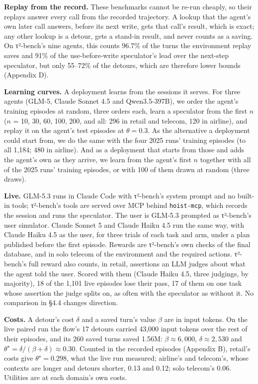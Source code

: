 \documentclass[10pt,twocolumn,letterpaper]{article}
\newcommand{\runin}[1]{{\sffamily\bfseries\color{accent}#1}}
\begin{document}
\runin{Replay from the record.} These benchmarks cannot be re-run cheaply, so their replays answer every call from the recorded trajectory. A lookup that the agent's own later call answers, before its next write, gets that call's result, which is exact; any other lookup is a detour, gets a stand-in result, and never counts as a saving. On τ²-bench's nine agents, this counts 96.7\% of the turns the environment replay saves and 91\% of the use-before-write speculator's lead over the next-step speculator, but only 55--72\% of the detours, which are therefore lower bounds (Appendix D).

\runin{Learning curves.} A deployment learns from the sessions it serves. For three agents (GLM-5, Claude Sonnet 4.5 and Qwen3.5-397B), we order the agent's training episodes at random, three orders each, learn a speculator from the first \(n\) (\(n\) = 10, 30, 60, 100, 200, and all: 296 in retail and telecom, 120 in airline), and replay it on the agent's test episodes at \(\theta = 0.3\). As the alternative a deployment could start from, we do the same with the four 2025 runs' training episodes (to all 1,184; 480 in airline). And as a deployment that starts from those and adds the agent's own as they arrive, we learn from the agent's first \(n\) together with all of the 2025 runs' training episodes, or with 100 of them drawn at random (three draws).

\runin{Live.} GLM-5.3 runs in Claude Code with τ²-bench's system prompt and no built-in tools; τ²-bench's tools are served over MCP behind \texttt{hoist-mcp}, which records the session and runs the speculator. The user is GLM-5.3 prompted as τ²-bench's user simulator. Claude Sonnet 5 and Claude Haiku 4.5 run the same way, with Claude Haiku 4.5 as the user, for three trials of each task and arm, under a plan published before the first episode. Rewards are τ²-bench's own checks of the final database, and in solo telecom of the environment and the required actions. τ²-bench's full reward also counts, in retail, assertions an LLM judges about what the agent told the user. Scored with them (Claude Haiku 4.5, three judgings, by majority), 18 of the 1,101 live episodes lose their pass, 17 of them on one task whose assertion the judge splits on, as often with the speculator as without it. No comparison in §4.4 changes direction.

\runin{Costs.} A detour's cost \(\delta\) and a saved turn's value \(\beta\) are in input tokens. On the live paired run the flow's 17 detours carried 43,000 input tokens over the rest of their episodes, and its 260 saved turns saved 1.56M: \(\beta \approx 6{,}000\), \(\delta \approx 2{,}530\) and \(\theta^\star = \delta/(\beta+\delta) \approx 0.30\). Counted in the recorded episodes (Appendix B), retail's costs give \(\theta^\star = 0.298\), what the live run measured; airline's and telecom's, whose contexts are longer and detours shorter, 0.13 and 0.12; solo telecom's 0.06. Utilities are at each domain's own costs.
\end{document}
